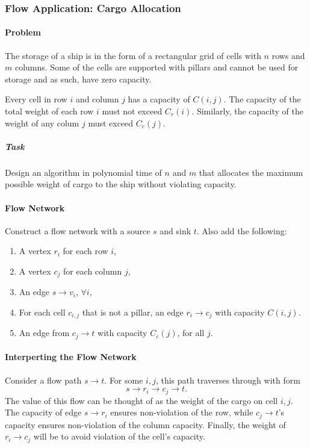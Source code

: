 \subsubsection{Flow Application: Cargo Allocation}

\paragraph{Problem}
The storage of a ship is in the form of a rectangular grid of cells with
\(n\) rows and  \(m\) columns. Some of the cells are supported with pillars
and cannot be used for storage and as such, have zero capacity.

Every cell in row \(i\) and column  \(j\) has a capacity of \(C(i, j)\).
The capacity of the total weight of each row \(i\) must not exceed
\(C_r(i)\). Similarly, the capacity of the weight of any colum \(j\) must
exceed \(C_c(j)\).

\subparagraph{Task}
Design an algorithm in polynomial time of \(n\) and \(m\) that allocates
the maximum possible weight of cargo to the ship without violating capacity.

\paragraph{Flow Network}
Construct a flow network with a source \(s\) and sink  \(t\).
Also add the following:
\begin{enumerate}
  \item A vertex \(r_i\) for each row  \(i\),
  \item A vertex  \(c_j\) for each column \(j\),
  \item An edge \(s \to v_i\), \(\forall i\),
  \item For each cell \(c_{i, j}\) that is not a pillar, an edge
    \(r_i \to c_j \) with capacity \(C(i, j)\).
  \item An edge from \(c_j \to  t\) with capacity \(C_c(j)\), for all \(j\).
\end{enumerate}

\paragraph{Interperting the Flow Network}
Consider a flow path \(s \to  t\).
For some \(i, j\), this path traverses through with form \[
  s \to r_i \to c_j \to t
.\] 
The value of this flow can be thought of as the weight of the cargo
on cell \(i, j\).
The capacity of edge \(s \to  r_i\) ensures non-violation of the row,
while \(c_j \to  t\)'s capacity ensures non-violation of the column capacity.
Finally, the weight of \(r_i \to  c_j\) will be to avoid violation
of the cell's capacity.

